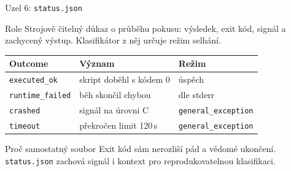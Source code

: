 \documentclass[aspectratio=169,10pt]{beamer}
\begin{document}
\begin{frame}[t]{Uzel 6: \texttt{status.json}}
  \small
  \begin{block}{Role}
    Strojově čitelný důkaz o průběhu pokusu: výsledek, exit kód, signál a
    zachycený výstup. Klasifikátor z něj určuje režim selhání.
  \end{block}

  \begin{table}
    \centering
    \begin{tabular}{@{}lll@{}}
      \toprule
      \textbf{Outcome} & \textbf{Význam} & \textbf{Režim} \\
      \midrule
      \texttt{executed\_ok} & skript doběhl s kódem 0 & úspěch \\
      \texttt{runtime\_failed} & běh skončil chybou & dle stderr \\
      \texttt{crashed} & signál na úrovni C & \texttt{general\_exception} \\
      \texttt{timeout} & překročen limit 120\,s & \texttt{general\_exception} \\
      \bottomrule
    \end{tabular}
  \end{table}

  \begin{alertblock}{Proč samostatný soubor}
    Exit kód sám nerozliší pád a vědomé ukončení. \texttt{status.json} zachová
    signál i kontext pro reprodukovatelnou klasifikaci.
  \end{alertblock}
\end{frame}
\end{document}

